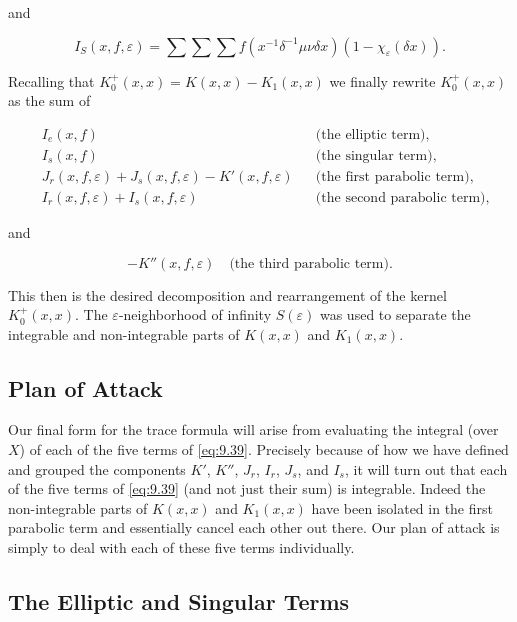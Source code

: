 and

\begin{equation}\label{eq:9.39}
I_S(x, f, \varepsilon) = \sum\sum\sum f(x^{-1}\delta^{-1}\mu\nu\delta x)(1 - \chi_\varepsilon(\delta x)).\tag{9.39}
\end{equation}

Recalling that $K_0^{+}(x, x) = K(x, x) - K_1(x, x)$ we finally rewrite $K_0^{+}(x, x)$ as the sum of

\begin{equation}\label{eq:9.40}
\begin{aligned}
&I_e(x, f) &&\text{(the elliptic term)},\\
&I_s(x, f) &&\text{(the singular term)},\\
&J_r(x, f, \varepsilon) + J_s(x, f, \varepsilon) - K'(x, f, \varepsilon) &&\text{(the first parabolic term)},\\
&I_r(x, f, \varepsilon) + I_s(x, f, \varepsilon) &&\text{(the second parabolic term)},
\end{aligned}\tag{9.40}
\end{equation}

and

\[
-K''(x, f, \varepsilon) \quad \text{(the third parabolic term)}.
\]

This then is the desired decomposition and rearrangement of the kernel $K_0^{+}(x,x)$. The $\varepsilon$-neighborhood of infinity $S(\varepsilon)$ was used to separate the integrable and non-integrable parts of $K(x,x)$ and $K_1(x,x)$.

\subsection{Plan of Attack}

Our final form for the trace formula will arise from evaluating the integral (over $X$) of each of the five terms of \eqref{eq:9.39}. Precisely because of how we have defined and grouped the components $K'$, $K''$, $J_r$, $I_r$, $J_s$, and $I_s$, it will turn out that each of the five terms of \eqref{eq:9.39} (and not just their sum) is integrable. Indeed the non-integrable parts of $K(x, x)$ and $K_1(x, x)$ have been isolated in the first parabolic term and essentially cancel each other out there. Our plan of attack is simply to deal with each of these five terms individually.

\subsection{The Elliptic and Singular Terms}


